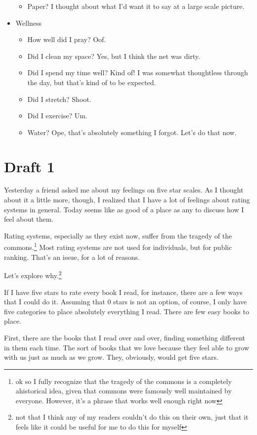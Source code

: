 \documentclass[12pt]{article}[titlepage]
\newcommand{\1}{\={a}}
\newcommand{\2}{\={e}}
\newcommand{\3}{\={\i}}
\newcommand{\4}{\=o}
\newcommand{\5}{\=u}
\newcommand{\6}{\={A}}
\renewcommand{\,}{\textsuperscript{,}}
\begin{document}
\begin{itemize}
\begin{itemize}
\item Paper? I thought about what I'd want it to say at a large scale picture.
\end{itemize}
\item Wellness
\begin{itemize}
\item How well did I pray? Oof.
\item Did I clean my space? Yes, but I think the net was dirty.
\item Did I spend my time well? Kind of! I was somewhat thoughtless through the day, but that's kind of to be expected.
\item Did I stretch? Shoot.
\item Did I exercise? Um.
\item Water? Ope, that's absolutely something I forgot. Let's do that now.
\end{itemize}
\end{itemize}


\section{Draft 1}
Yesterday a friend asked me about my feelings on five star scales.
As I thought about it a little more, though, I realized that I have a lot of feelings about rating systems in general.
Today seems like as good of a place as any to discuss how I feel about them.

Rating systems, especially as they exist now, suffer from the tragedy of the commons.\footnote{ok so I fully recognize that the tragedy of the commons is a completely ahistorical idea, given that commons were famously well maintained by everyone. However, it's a phrase that works well enough right now}
Most rating systems are not used for individuals, but for public ranking.
That's an issue, for a lot of reasons.

Let's explore why.\footnote{not that I think any of my readers couldn't do this on their own, just that it feels like it could be useful for me to do this for myself}

If I have five stars to rate every book I read, for instance, there are a few ways that I could do it.
Assuming that 0 stars is not an option, of course, I only have five categories to place absolutely everything I read.
There are few easy books to place.

First, there are the books that I read over and over, finding something different in them each time.
The sort of books that we love because they feel able to grow with us just as much as we grow.
They, obviously, would get five stars.
\end{document}
